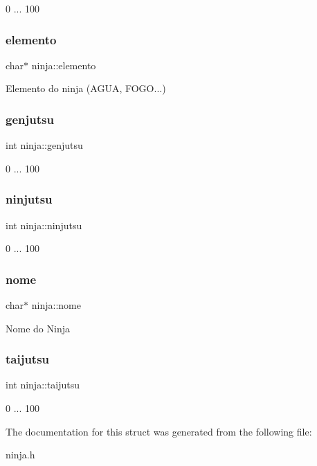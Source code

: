 0 ... 100 \mbox{\label{structninja_a0461035a441b95091803732b1bd4e76c}} 
\subsubsection{\texorpdfstring{elemento}{elemento}}
{\footnotesize\ttfamily char$\ast$ ninja\+::elemento}

Elemento do ninja (A\+G\+UA, F\+O\+GO...) \mbox{\label{structninja_adfb9e88d0513d41d9750134763f2cccd}} 
\subsubsection{\texorpdfstring{genjutsu}{genjutsu}}
{\footnotesize\ttfamily int ninja\+::genjutsu}

0 ... 100 \mbox{\label{structninja_a6b840282381ec6145bc4c2ef512b4b74}} 
\subsubsection{\texorpdfstring{ninjutsu}{ninjutsu}}
{\footnotesize\ttfamily int ninja\+::ninjutsu}

0 ... 100 \mbox{\label{structninja_a09c81900a27da1cf72d9b6f44b4051f2}} 
\subsubsection{\texorpdfstring{nome}{nome}}
{\footnotesize\ttfamily char$\ast$ ninja\+::nome}

Nome do Ninja \mbox{\label{structninja_aceb226ee3b2a48bc1bdfc29237adb5e5}} 
\subsubsection{\texorpdfstring{taijutsu}{taijutsu}}
{\footnotesize\ttfamily int ninja\+::taijutsu}

0 ... 100 

The documentation for this struct was generated from the following file\+:\begin{DoxyCompactItemize}
\item 
ninja.\+h\end{DoxyCompactItemize}
